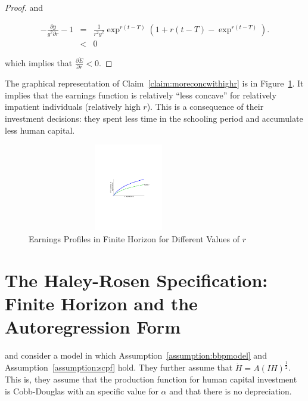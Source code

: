 \begin{proof}
\noindent and

\begin{eqnarray}
- \frac{\partial g }{g^2 \partial r} - 1 &=& \frac{1}{r^2g^2} \exp^{r(t-T)} \left( 1 + r(t - T) - \exp^{r(t-T)} \right). \nonumber \\
&<& 0
\end{eqnarray}

\noindent which implies that $\frac{\partial \dot{E}}{\partial r} < 0$. 
\end{proof}

\indent The graphical representation of Claim~\ref{claim:moreconcwithighr} is in Figure~\ref{fig:earnprofr}. It implies that the earnings function is relatively ``less concave'' for relatively impatient individuals (relatively high $r$). This is a consequence of their investment decisions: they spent less time in the schooling period and accumulate less human capital.

\begin{center}
\begin{figure}[H]
\caption{Earnings Profiles in Finite Horizon for Different Values of $r$ } \label{fig:earnprofr}
\centering
\includegraphics[width=3.5in, height=1.5in]{Figures/fig-earnings-growth.pdf}
\floatfoot{\begin{small}
\end{small}}
\end{figure}
\end{center} 

\section{The Haley-Rosen Specification: Finite Horizon and the Autoregression Form}

\citet{haley1976estimation} and \citet{rosen1976theory} consider a model in which  Assumption~\ref{assumption:bbpmodel} and Assumption~\ref{assumption:scpf} hold. They further assume that $\dot{H} = A \left( IH \right)^{\frac{1}{2}}$. This is, they assume that the production function for human capital investment is Cobb-Douglas with an specific value for $\alpha$ and that there is no depreciation.

